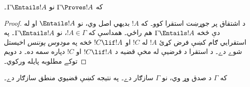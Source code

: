 \documentclass[../../../include/open-logic-section]{subfiles}
\begin{document}


\begin{thm}[سموالے]
که $\Gamma\Proves!A$ نو $\Gamma \Entails !A$۔
\end{thm}

\begin{proof}
د اشتقاق پر جوړښت استقرا کوو۔ که $!A$ بديهي اصل وي، نو $\Entails
!A$ او له دې څخه $\Gamma \Entails!A$ هم راځي۔ همداسې که $!A \in \Gamma$، نو $\Gamma \Entails!A$۔ په استقرايي ګام کښې فرض کړئ $!A$ له $!C$ او $!C\lif!A$ څخه په \emph{مودوس پوننس} اخيستل شوے دے۔ د استقرا د فرضيې له مخې قضيه د $!C\lif !A$ او $!C$ دپاره سمه ده۔ د  دويم توکے مطلوبه پايله ورکوي۔
\end{proof}

\begin{cor}
که $\Gamma$ د صدق وړ وي، نو $\Gamma$ سازګار دے۔ په نتيجه کښې قضيوي منطق سازګار دے۔
\end{cor}
\end{document}
